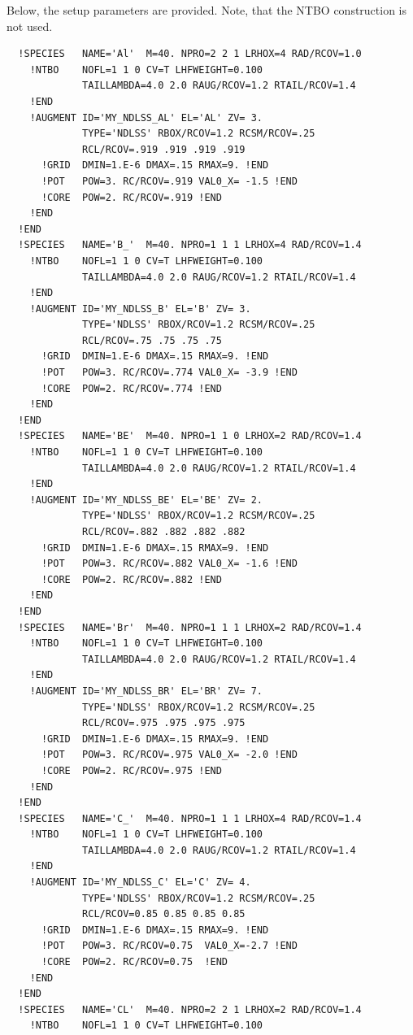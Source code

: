 \documentclass{book}
\begin{document}
Below, the setup parameters are provided. Note, that the NTBO
construction is not used.
{\tiny
\begin{verbatim}
  !SPECIES   NAME='Al'  M=40. NPRO=2 2 1 LRHOX=4 RAD/RCOV=1.0
    !NTBO    NOFL=1 1 0 CV=T LHFWEIGHT=0.100
             TAILLAMBDA=4.0 2.0 RAUG/RCOV=1.2 RTAIL/RCOV=1.4 
    !END 
    !AUGMENT ID='MY_NDLSS_AL' EL='AL' ZV= 3.
             TYPE='NDLSS' RBOX/RCOV=1.2 RCSM/RCOV=.25
             RCL/RCOV=.919 .919 .919 .919
      !GRID  DMIN=1.E-6 DMAX=.15 RMAX=9. !END
      !POT   POW=3. RC/RCOV=.919 VAL0_X= -1.5 !END
      !CORE  POW=2. RC/RCOV=.919 !END
    !END
  !END
  !SPECIES   NAME='B_'  M=40. NPRO=1 1 1 LRHOX=4 RAD/RCOV=1.4
    !NTBO    NOFL=1 1 0 CV=T LHFWEIGHT=0.100
             TAILLAMBDA=4.0 2.0 RAUG/RCOV=1.2 RTAIL/RCOV=1.4 
    !END 
    !AUGMENT ID='MY_NDLSS_B' EL='B' ZV= 3.
             TYPE='NDLSS' RBOX/RCOV=1.2 RCSM/RCOV=.25
             RCL/RCOV=.75 .75 .75 .75
      !GRID  DMIN=1.E-6 DMAX=.15 RMAX=9. !END
      !POT   POW=3. RC/RCOV=.774 VAL0_X= -3.9 !END
      !CORE  POW=2. RC/RCOV=.774 !END
    !END
  !END
  !SPECIES   NAME='BE'  M=40. NPRO=1 1 0 LRHOX=2 RAD/RCOV=1.4
    !NTBO    NOFL=1 1 0 CV=T LHFWEIGHT=0.100
             TAILLAMBDA=4.0 2.0 RAUG/RCOV=1.2 RTAIL/RCOV=1.4 
    !END 
    !AUGMENT ID='MY_NDLSS_BE' EL='BE' ZV= 2.
             TYPE='NDLSS' RBOX/RCOV=1.2 RCSM/RCOV=.25
             RCL/RCOV=.882 .882 .882 .882
      !GRID  DMIN=1.E-6 DMAX=.15 RMAX=9. !END
      !POT   POW=3. RC/RCOV=.882 VAL0_X= -1.6 !END
      !CORE  POW=2. RC/RCOV=.882 !END
    !END
  !END
  !SPECIES   NAME='Br'  M=40. NPRO=1 1 1 LRHOX=2 RAD/RCOV=1.4
    !NTBO    NOFL=1 1 0 CV=T LHFWEIGHT=0.100
             TAILLAMBDA=4.0 2.0 RAUG/RCOV=1.2 RTAIL/RCOV=1.4 
    !END 
    !AUGMENT ID='MY_NDLSS_BR' EL='BR' ZV= 7.
             TYPE='NDLSS' RBOX/RCOV=1.2 RCSM/RCOV=.25
             RCL/RCOV=.975 .975 .975 .975
      !GRID  DMIN=1.E-6 DMAX=.15 RMAX=9. !END
      !POT   POW=3. RC/RCOV=.975 VAL0_X= -2.0 !END
      !CORE  POW=2. RC/RCOV=.975 !END
    !END
  !END
  !SPECIES   NAME='C_'  M=40. NPRO=1 1 1 LRHOX=4 RAD/RCOV=1.4
    !NTBO    NOFL=1 1 0 CV=T LHFWEIGHT=0.100
             TAILLAMBDA=4.0 2.0 RAUG/RCOV=1.2 RTAIL/RCOV=1.4 
    !END 
    !AUGMENT ID='MY_NDLSS_C' EL='C' ZV= 4.
             TYPE='NDLSS' RBOX/RCOV=1.2 RCSM/RCOV=.25
             RCL/RCOV=0.85 0.85 0.85 0.85 
      !GRID  DMIN=1.E-6 DMAX=.15 RMAX=9. !END
      !POT   POW=3. RC/RCOV=0.75  VAL0_X=-2.7 !END
      !CORE  POW=2. RC/RCOV=0.75  !END
    !END
  !END
  !SPECIES   NAME='CL'  M=40. NPRO=2 2 1 LRHOX=2 RAD/RCOV=1.4
    !NTBO    NOFL=1 1 0 CV=T LHFWEIGHT=0.100

\end{verbatim}}
\end{document}
